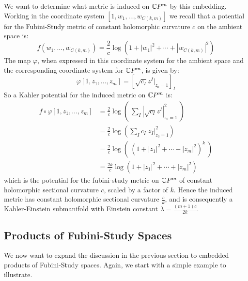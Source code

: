 We want to determine what metric is induced on $\mathbb{C}P^m$ by this embedding.  Working in the coordinate system $[1, w_1, \ldots, w_{C(k,m)}]$ we recall that a potential for the Fubini-Study metric of constant holomorphic curvature $c$ on the ambient space is:
%
$$ f( w_1, \ldots, w_{C(k,m)} ) = \frac{2}{c} \log ( 1 + |w_1|^2 + \cdots + | w_{C(k,m)} |^2 ) $$
%
The map $\varphi$, when expressed in this coordinate system for the ambient space and the corresponding coordinate system for $\mathbb{C}P^m$, is given by:
%
$$ \varphi[ 1, z_1, \ldots, z_m ] = \left[ \sqrt{ c_I } z^I |_{z_0 = 1} \right]_I $$
%
So a Kahler potential for the induced metric on $\mathbb{C}P^m$ is:
%
\begin{align*}
f \circ \varphi[ 1, z_1, \ldots, z_m ] &= \frac{2}{c} \log \left( \ \sum_I | \sqrt{ c_I } z^I  |^2_{z_0 = 1} \ \right) \\
&= \frac{2}{c} \log \left( \sum_I c_I |z_I|^2_{z_0 = 1} \right) \\
&= \frac{2}{c} \log( \ ( 1 + |z_1|^2 + \cdots + |z_m|^2 )^k \ ) \\
&= \frac{2k}{c} \log( 1 + |z_1|^2 + \cdots + |z_m|^2 ) 
\end{align*}
%
which is the potential for the fubini-study metric on $\mathbb{C}P^m$ of constant holomorphic sectional curvature $c$, scaled by a factor of $k$.  Hence the induced metric has constant holomorphic sectional curvature $\frac{c}{k}$, and is consequently a Kahler-Einstein submanifold with Einstein constant $\lambda = \frac{(m+1)c}{2k}$.

\subsection{Products of Fubini-Study Spaces}

We now want to expand the discussion in the previous section to embedded products of Fubini-Study spaces.  Again, we start with a simple example to illustrate.

